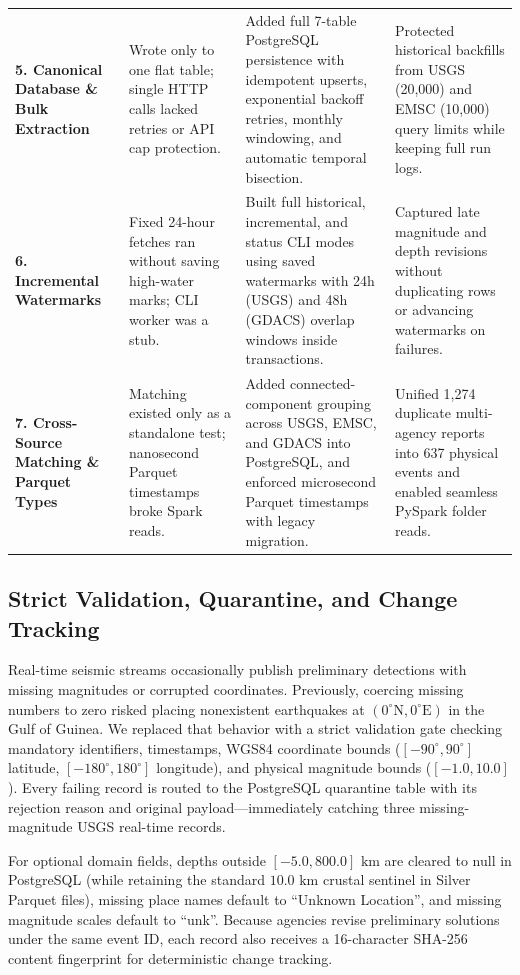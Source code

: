 \begin{table}[!t]
\begin{tabularx}{\textwidth}{p{2.6cm} p{4.2cm} p{4.7cm} X}
\textbf{5. Canonical Database \& Bulk Extraction} & Wrote only to one flat table; single HTTP calls lacked retries or API cap protection. & Added full 7-table PostgreSQL persistence with idempotent upserts, exponential backoff retries, monthly windowing, and automatic temporal bisection. & Protected historical backfills from USGS (20,000) and EMSC (10,000) query limits while keeping full run logs. \\
\textbf{6. Incremental Watermarks} & Fixed 24-hour fetches ran without saving high-water marks; CLI worker was a stub. & Built full historical, incremental, and status CLI modes using saved watermarks with 24h (USGS) and 48h (GDACS) overlap windows inside transactions. & Captured late magnitude and depth revisions without duplicating rows or advancing watermarks on failures. \\
\textbf{7. Cross-Source Matching \& Parquet Types} & Matching existed only as a standalone test; nanosecond Parquet timestamps broke Spark reads. & Added connected-component grouping across USGS, EMSC, and GDACS into PostgreSQL, and enforced microsecond Parquet timestamps with legacy migration. & Unified 1,274 duplicate multi-agency reports into 637 physical events and enabled seamless PySpark folder reads. \\
\bottomrule
\end{tabularx}
\end{table}

\subsection{Strict Validation, Quarantine, and Change Tracking}
Real-time seismic streams occasionally publish preliminary detections with missing magnitudes or corrupted coordinates. Previously, coercing missing numbers to zero risked placing nonexistent earthquakes at $(0^\circ\text{N}, 0^\circ\text{E})$ in the Gulf of Guinea. We replaced that behavior with a strict validation gate checking mandatory identifiers, timestamps, WGS84 coordinate bounds ($[-90^\circ, 90^\circ]$ latitude, $[-180^\circ, 180^\circ]$ longitude), and physical magnitude bounds ($[-1.0, 10.0]$). Every failing record is routed to the PostgreSQL quarantine table with its rejection reason and original payload---immediately catching three missing-magnitude USGS real-time records.

For optional domain fields, depths outside $[-5.0, 800.0]\text{ km}$ are cleared to null in PostgreSQL (while retaining the standard $10.0\text{ km}$ crustal sentinel in Silver Parquet files), missing place names default to ``Unknown Location'', and missing magnitude scales default to ``unk''. Because agencies revise preliminary solutions under the same event ID, each record also receives a 16-character SHA-256 content fingerprint for deterministic change tracking.

